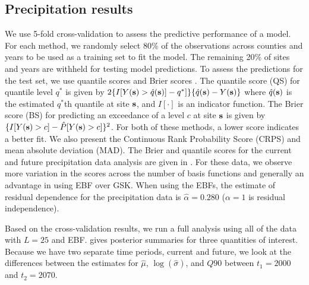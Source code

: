 \documentclass[aoas]{imsart}
\begin{document}
\subsection{Precipitation results} \label{ebs:results-precip}

We use 5-fold cross-validation to assess the predictive performance of a model.
For each method, we randomly select 80\% of the observations across counties and years to be used as a training set to fit the model.
The remaining 20\% of sites and years are withheld for testing model predictions.
To assess the predictions for the test set, we use quantile scores and Brier scores \citep{Gneiting2007}.
The quantile score (QS) for quantile level $q^*$ is given by \mbox{$2 \{I[Y(\mathbf{s}) > \hat{q}(\mathbf{s})] - q^*]\}\{\hat{q}(\mathbf{s}) - Y(\mathbf{s})\}$} where $\hat{q}(\mathbf{s})$ is the estimated $q^*$th quantile at site $\mathbf{s}$, and $I[\cdot]$ is an indicator function.
The Brier score (BS) for predicting an exceedance of a level $c$ at site $\mathbf{s}$ is given by \mbox{$\{I[Y(\mathbf{s}) > c] - \hat{P}[Y(\mathbf{s}) > c]\}^2$}.
For both of these methods, a lower score indicates a better fit.
We also present the Continuous Rank Probability Score (CRPS) \citep[see equation (21)]{Gneiting2007} and mean absolute deviation (MAD).
The Brier and quantile scores for the current and future precipitation data analysis are given in .
For these data, we observe more variation in the scores across the number of basis functions and generally an advantage in using EBF over GSK.
When using the EBFs, the estimate of residual dependence for the precipitation data is $\hat{\alpha} = 0.280$ ($\alpha = 1$ is residual independence).

Based on the cross-validation results, we run a full analysis using all of the data with $L = 25$ and EBF.
 gives posterior summaries for three quantities of interest.
Because we have two separate time periods, current and future, we look at the differences between the estimates for $\hat{\mu}$, $\log(\hat{\sigma})$, and $Q90$ between $t_1 = 2000$ and $t_2 = 2070$.
\end{document}
